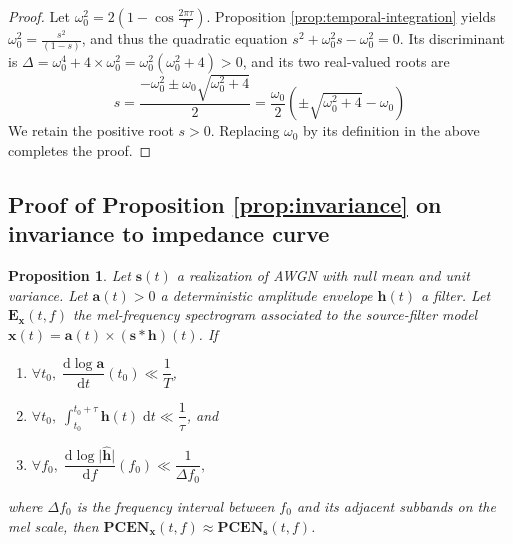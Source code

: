\documentclass[journal]{IEEEtran}
\newtheorem*{prop*}{Proposition}
\theoremstyle{remark}
\begin{document}
\begin{proof}
Let $\omega_0^2 = 2 \left(1 - \cos \frac{2\pi \tau}{T}\right)$.
Proposition \ref{prop:temporal-integration} yields
$\omega_0^2 = \frac{s^2}{(1-s)}$, and thus the quadratic equation
$s^2 + \omega_0^2 s - \omega_0^2 = 0$.
Its discriminant is $\Delta = \omega_0^4 + 4 \times \omega_0^2 = \omega_0^2 (\omega_0^2 + 4) > 0$, and its two real-valued roots are
\begin{equation}
s = \frac{- \omega_0^2 \pm \omega_0 \sqrt{\omega_0^2 +4}}{2}
= \frac{\omega_0}{2} \left(\pm\sqrt{\omega_0^2 + 4} - \omega_0\right)
\end{equation}
We retain the positive root $s > 0$. Replacing $\omega_0$ by its definition in the above completes the proof.
\end{proof}


\subsection{Proof of Proposition \ref{prop:invariance} on invariance to impedance curve}

\begin{prop*}
Let $\mathbf{s}(t)$ a realization of AWGN with null mean and unit variance.
Let $\mathbf{a}(t) > 0$ a deterministic amplitude envelope $\mathbf{h}(t)$ a filter.
Let $\mathbf{E}_\mathbf{x}(t,f)$ the mel-frequency spectrogram associated to the source-filter model $\mathbf{x}(t) = \mathbf{a}(t) \times (\mathbf{s}\ast\mathbf{h})(t)$.
If
\begin{enumerate}
\item $\forall t_0,\; \dfrac{\mathrm{d}\log \mathbf{a}}{\mathrm{d}t} (t_0) \ll \dfrac{1}{T}$,
\item $\forall t_0,\; \int_{t_0}^{t_0+\tau} \mathbf{h}(t)\;\mathrm{d}t \ll \dfrac{1}{\tau}$, and
\item $\forall f_0,\; \dfrac{\mathrm{d}\log \vert \widehat{\mathbf{h}}\vert}{\mathrm{d}f}(f_0) \ll
\dfrac{1}{\Delta f_0},
$
\end{enumerate}
where $\Delta f_0$ is the frequency interval between $f_0$ and its adjacent subbands on the mel scale,
then $\mathbf{PCEN_x}(t,f) \approx \mathbf{PCEN_s}(t,f)$.
\end{prop*}

\renewenvironment{proof}{\emph{Proof.}}{\qed}
\end{document}
